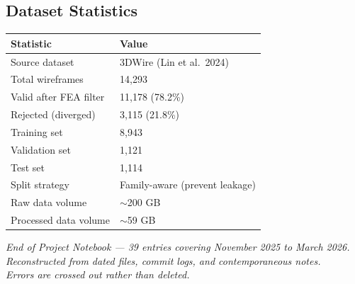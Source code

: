 \documentclass[11pt, letterpaper]{article}
\begin{document}
\subsection{Dataset Statistics}
\begin{tabular}{ll}
  \toprule
  \textbf{Statistic} & \textbf{Value} \\
  \midrule
  Source dataset & 3DWire (Lin et al.\ 2024) \\
  Total wireframes & 14,293 \\
  Valid after FEA filter & 11,178 (78.2\%) \\
  Rejected (diverged) & 3,115 (21.8\%) \\
  Training set & 8,943 \\
  Validation set & 1,121 \\
  Test set & 1,114 \\
  Split strategy & Family-aware (prevent leakage) \\
  Raw data volume & $\sim$200 GB \\
  Processed data volume & $\sim$59 GB \\
  \bottomrule
\end{tabular}

\vfill
\begin{center}
  \color{notegray}\small\itshape
  End of Project Notebook --- 39 entries covering November 2025 to March 2026.\\
  Reconstructed from dated files, commit logs, and contemporaneous notes.\\
  Errors are crossed out rather than deleted.
\end{center}
\end{document}
